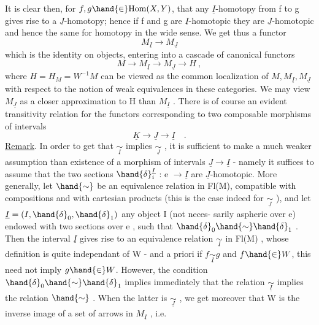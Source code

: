 It is clear then,  for $f,g\hand{\in}\mathrm{Hom}(X,Y)$,  that any $\underline{I}$-homotopy from f to g
gives rise to a $\underline{J}$-homotopy; hence if f and g are $\underline{I}$-homotopic they are
$\underline{J}$-homotopic  and hence the same for homotopy in the wide sense.  We get
thus a  functor
\[ M_{\underline{I}} \to M_{\underline{J}} \]
which is the identity on objects,  entering into a cascade of canonical
functors
\[ M \to M_{\underline{I}} \longrightarrow M_{\underline{J}} \to H \ , \]
where  $H=H_M= W^{-1} M$  can be viewed as the common localization of $M,M_{\underline{I}},M_{\underline{J}}$
with respect to the notion of weak equivalences in these categories.  We
may view $M_{\underline{J}}$  as a closer approximation to H than $M_{\underline{I}}$ .  There  is of course
an evident transitivity relation for the functors corresponding to two
composable morphisms of intervals
\[ \underline{K} \to \underline{J} \to \underline{I} \quad . \]
\uline{Remark}.  In order to get that $\underset{\underline{I}}{\sim}$ implies $\underset{\underline{J}}{\sim}$ ,  it is sufficient to
make a much weaker assumption than existence of a morphism of intervals
$\underline{J}\to\underline{I}$  -  namely it suffices to assume that the two sections $\hand{\delta}^{\underline{I}}_{i}$ : e $\to \underline{I}$
are $\underline{J}$-homotopic.  More generally,  let $\hand{\sim}$ be an equivalence relation in
Fl(M),  compatible with compositions and with cartesian products (this is
the case indeed for $\underset{\underline{J}}{\sim}$ ),  and let  $\underline{I} = (I,\hand{\delta}_0,\hand{\delta}_1)$ any object I  (not neces-%
sarily aspheric over e) endowed with two sections over e ,  such that
$\hand{\delta}_0\hand{\sim}\hand{\delta}_1$ .   Then the interval $\underline{I}$ gives rise to an equivalence relation $\underset{\underline{I}}{\sim}$
in Fl(M) , whose definition is quite independant of W -  and a priori
 if  $f\underset{\underline{I}}{\sim}g$  and $f\hand{\in}W$,  this need not
imply $g\hand{\in}W$.  However,  the condition $\hand{\delta}_0\hand{\sim}\hand{\delta}_1$  implies immediately that the
 relation  $\underset{\underline{I}}{\sim}$  implies the relation $\hand{\sim}$ .  When the latter is
$\underset{\underline{J}}{\sim}$ ,  we get moreover that W is the inverse image of a set of arrows in
$M_{\underline{I}}$ , i.e. 

